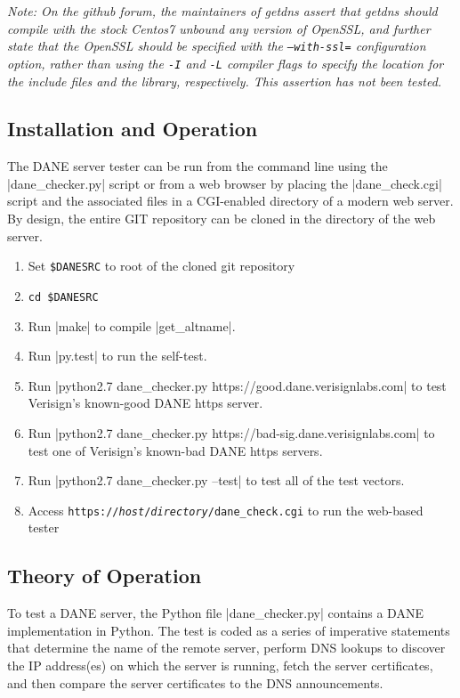 \documentclass[preprint,3p,11pt]{elsarticle}
\begin{document}
\emph{Note: On the github forum, the maintainers of getdns assert that
getdns should compile with the stock Centos7 unbound any version of
OpenSSL, and further state that the OpenSSL should be specified with
the \texttt{--with-ssl=} configuration option, rather than using the
\texttt{-I} and \texttt{-L} compiler flags to specify the location for the include
files and the library, respectively. This assertion has not been tested.}

\subsection{Installation and Operation}

The DANE server tester can be run from the command line using the
|dane_checker.py| script or from a web browser by placing the
|dane_check.cgi| script and the associated files in a
CGI-enabled directory of a modern web server. By design, the entire
GIT repository can be cloned in the directory of the web server.

\begin{enumerate}
\item Set \verb|$DANESRC| to root of the cloned git repository
\item \verb|cd $DANESRC|
\item Run |make| to compile |get_altname|.
\item Run |py.test| to run the self-test.
\item Run |python2.7 dane_checker.py https://good.dane.verisignlabs.com| to test Verisign's known-good
  DANE https server.
\item Run |python2.7 dane_checker.py https://bad-sig.dane.verisignlabs.com| to test one of Verisign's
  known-bad DANE https servers.
\item Run |python2.7 dane_checker.py --test| to test all of the test vectors.
\item Access \texttt{https://\emph{host}/\emph{directory}/dane\_check.cgi} to run
  the web-based tester
\end{enumerate}


\subsection{Theory of Operation}

To test a DANE server, the Python file |dane_checker.py| contains a
DANE implementation in Python. The test is coded as a series of
imperative statements that determine the name of the remote server,
perform DNS lookups to discover the IP address(es) on which the server
is running, fetch the server certificates, and then compare the server
certificates to the DNS announcements. 
\end{document}
